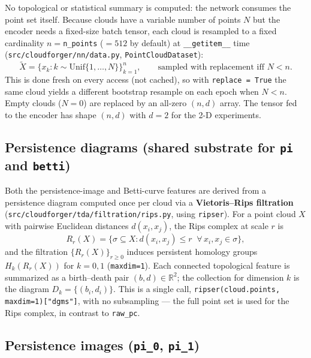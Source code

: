 \documentclass[11pt]{article}
\begin{document}
No topological or statistical summary is computed: the network consumes the
point set itself. Because clouds have a variable number of points $N$ but
the encoder needs a fixed-size batch tensor, each cloud is resampled to a
fixed cardinality $n=$\texttt{n\_points} ($=512$ by default) at
\texttt{\_\_getitem\_\_} time (\texttt{src/cloudforger/nn/data.py},
\texttt{PointCloudDataset}):
\[
  \tilde X = \{ x_{k} : k \sim \mathrm{Unif}\{1,\dots,N\}\}_{k=1}^{n},
  \qquad \text{sampled with replacement iff } N < n.
\]
This is done fresh on every access (not cached), so with
\texttt{replace = True} the same cloud yields a different bootstrap
resample on each epoch when $N<n$. Empty clouds ($N=0$) are replaced by an
all-zero $(n,d)$ array. The tensor fed to the encoder has shape
$(n, d)$ with $d=2$ for the 2-D experiments.

\subsection{Persistence diagrams (shared substrate for \texttt{pi} and \texttt{betti})}

Both the persistence-image and Betti-curve features are derived from a
persistence diagram computed once per cloud via a \textbf{Vietoris--Rips
filtration} (\texttt{src/cloudforger/tda/filtration/rips.py}, using
\texttt{ripser}). For a point cloud $X$ with pairwise Euclidean distances
$d(x_i,x_j)$, the Rips complex at scale $r$ is
\[
  R_r(X) = \{\sigma \subseteq X : d(x_i,x_j) \le r \;\; \forall\, x_i,x_j\in\sigma\},
\]
and the filtration $\{R_r(X)\}_{r\ge0}$ induces persistent homology groups
$H_k(R_r(X))$ for $k=0,1$ (\texttt{maxdim=1}). Each connected topological
feature is summarized as a birth--death pair $(b,d)\in \mathbb R^2$; the
collection for dimension $k$ is the diagram $D_k = \{(b_i,d_i)\}$. This is a
single call, \texttt{ripser(cloud.points, maxdim=1)["dgms"]}, with no
subsampling — the full point set is used for the Rips complex, in contrast
to \texttt{raw\_pc}.

\subsection{Persistence images (\texttt{pi\_0}, \texttt{pi\_1})}
\end{document}
